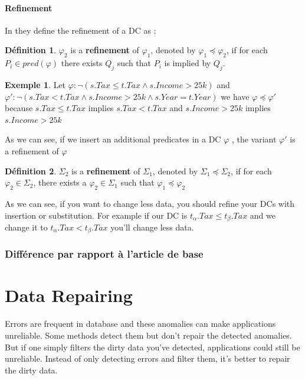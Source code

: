 \documentclass[letterpaper, 12pt]{report}
\theoremstyle{definition}
\newtheorem{mydef}{Définition}
\newtheorem{myexample}{Exemple}
\begin{document}
\subsubsection{Refinement}
\label{RefinementSection}
In \cite{main} they define the refinement of a DC as :

\begin{mydef}
 $\varphi_2$ is a \textbf{refinement} of $\varphi_1$, denoted by $\varphi_1 \preceq \varphi_2$, if for each $P_i \in pred(\varphi)$ there exists $Q_j$ such that $P_i$ is implied by $Q_j$. 
\end{mydef}

\begin{myexample}
	Let $\varphi : \neg(s.Tax \leq t.Tax \wedge s.Income > 25k)$ and $\varphi ' : \neg(s.Tax < t.Tax \wedge s.Income > 25k \wedge s.Year = t.Year)$ we have $\varphi \preceq \varphi'$ because $s.Tax \leq t.Tax$ implies $s.Tax < t.Tax$ and $s.Income > 25k$ implies $s.Income > 25k$
\end{myexample}

As we can see, if we insert an additional predicates in a DC $\varphi$ , the variant $\varphi '$ is a refinement of $\varphi$
\begin{mydef}
 $\Sigma_2$ is a \textbf{refinement} of $\Sigma_1$, denoted by $\Sigma_1 \preceq \Sigma_2$, if for each $ \varphi_2 \in \Sigma_2$, there exists a $\varphi_2 \in \Sigma_1$ such that $\varphi_1 \preceq \varphi_2$
\end{mydef}

As we can see, if you want to change less data, you should refine your DCs with insertion or substitution. For example if our DC is $t_\alpha.Tax \leq t_\beta.Tax$ and we change it to $t_\alpha.Tax < t_\beta.Tax$ you'll change less data.

\subsection{Différence par rapport à l'article de base}

\chapter{Data Repairing}

Errors are frequent in database and these anomalies can make applications unreliable. Some methods detect them but don't repair the detected anomalies. But if one simply filters the dirty data you've detected, applications could still be unreliable. \cite{anodetect} Instead of only detecting errors and filter them, it's better to repair the dirty data.\\
\end{document}
